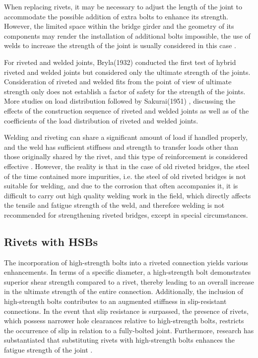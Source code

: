 When replacing rivets, it may be necessary to adjust the length of the joint to accommodate the possible addition of extra bolts to enhance its strength. However, the limited space within the bridge girder and the geometry of its components may render the installation of additional bolts impossible, the use of welds to increase the strength of the joint is usually considered in this case \cite{Thomas2000}.

For riveted and welded joints, Bryla(1932)\cite{bryla1932Tests} conducted the first test of hybrid riveted and welded joints but considered only the ultimate strength of the joints. Consideration of riveted and welded fits from the point of view of ultimate strength only does not establish a factor of safety for the strength of the joints. More studies on load distribution followed by Sakurai(1951) \cite{sakurai1951Experimental}, discussing the effects of the construction sequence of riveted and welded joints as well as of the coefficients of the load distribution of riveted and welded joints.

Welding and riveting can share a significant amount of load if handled properly, and the weld has sufficient stiffness and strength to transfer loads other than those originally shared by the rivet, and this type of reinforcement is considered effective \cite{young1934Relative,hiroshi2001Experimental,meier2000composite}. However, the reality is that in the case of old riveted bridges, the steel of the time contained more impurities, i.e. the steel of old riveted bridges is not suitable for welding, and due to the corrosion that often accompanies it, it is difficult to carry out high quality welding work in the field, which directly affects the tensile and fatigue strength of the weld, and therefore welding is not recommended for strengthening riveted bridges, except in special circumstances.

\subsection{Rivets with HSBs}

The incorporation of high-strength bolts into a riveted connection yields various enhancements. In terms of a specific diameter, a high-strength bolt demonstrates superior shear strength compared to a rivet, thereby leading to an overall increase in the ultimate strength of the entire connection. Additionally, the inclusion of high-strength bolts contributes to an augmented stiffness in slip-resistant connections. In the event that slip resistance is surpassed, the presence of rivets, which possess narrower hole clearances relative to high-strength bolts, restricts the occurrence of slip in relation to a fully-bolted joint. Furthermore, research has substantiated that substituting rivets with high-strength bolts enhances the fatigue strength of the joint \cite{reemsnyder1975Fatigue}.


